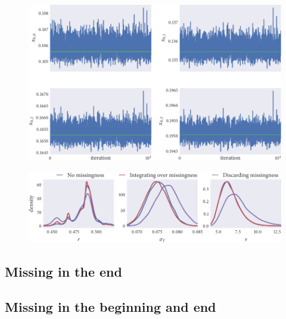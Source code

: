 \begin{figure}[tbp]
  \includegraphics{beg/x_trace.pdf}
  \caption{}
  \label{fig:beg_x_trace}
\end{figure}

\begin{figure}[tbp]
  \includegraphics{beg/compare_params.pdf}
  \caption{}
  \label{fig:beg_compare}
\end{figure}


\subsection{Missing in the end}

\subsection{Missing in the beginning and end}

